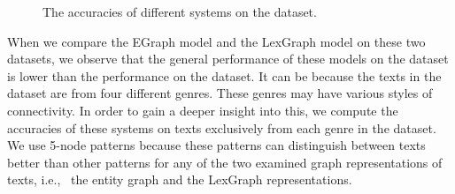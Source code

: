\begin{figure}[!ht]
  \begin{center}
      \mydata
  \end{center}
  \caption{The accuracies of different systems on the \declercqds dataset.}
  \label{fig:declercq-ds}
\end{figure}

When we compare the EGraph model and the LexGraph model on these two datasets, we observe that the general performance of these models on the \declercqds dataset is lower than the performance on the \pitlerds dataset. 
It can be because the texts in the \declercqds dataset are from four different genres. These genres may have various styles of connectivity.  
In order to gain a deeper insight into this, we compute the accuracies of these systems on texts exclusively from each genre in the \declercqds dataset. 
We use 5-node patterns because these patterns can distinguish between texts better than other patterns for any of the two examined graph representations of texts, i.e., \ the entity graph and the \mbox{LexGraph} representations. 

